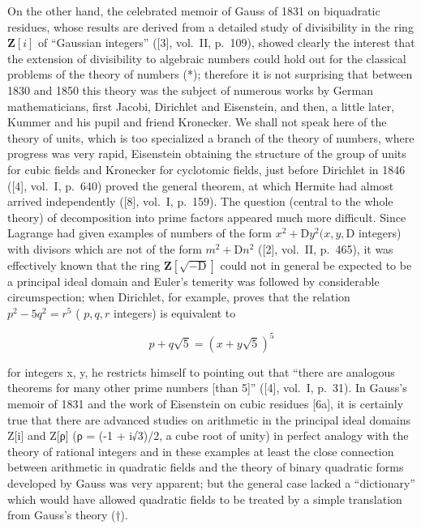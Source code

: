 On the other hand, the celebrated memoir of Gauss of 1831 on biquadratic residues, whose results are derived from a detailed study of divisibility in the ring \(\mathbf{Z}[i]\) of ``Gaussian integers'' ({[}3{]}, vol.~II, p.~109), showed clearly the interest that the extension of divisibility to algebraic numbers could hold out for the classical problems of the theory of numbers (*); therefore it is not surprising that between 1830 and 1850 this theory was the subject of numerous works by German mathematicians, first Jacobi, Dirichlet and Eisenstein, and then, a little later, Kummer and his pupil and friend Kronecker. We shall not speak here of the theory of units, which is too specialized a branch of the theory of numbers, where progress was very rapid, Eisenstein obtaining the structure of the group of units for cubic fields and Kronecker for cyclotomic fields, just before Dirichlet in 1846 ({[}4{]}, vol.~I, p.~640) proved the general theorem, at which Hermite had almost arrived independently ({[}8{]}, vol.~I, p.~159). The question (central to the whole theory) of decomposition into prime factors appeared much more difficult. Since Lagrange had given examples of numbers of the form \(x^{2} + \mathrm{D}y^{2}(x,y,\mathrm{D}\) integers) with divisors which are not of the form \(m^2 +\mathrm{D}n^2\) ({[}2{]}, vol.~II, p.~465), it was effectively known that the ring \(\mathbf{Z}[\sqrt{-\mathrm{D}} ]\) could not in general be expected to be a principal ideal domain and Euler's temerity was followed by considerable circumspection; when Dirichlet, for example, proves that the relation \(p^2 -5q^2 = r^5\) ( \(p,q,r\) integers) is equivalent to

\[
p + q \sqrt {5} = (x + y \sqrt {5}) ^ {5}
\]

for integers x, y, he restricts himself to pointing out that ``there are analogous theorems for many other prime numbers {[}than 5{]}'' ({[}4{]}, vol.~I, p.~31). In Gauss's memoir of 1831 and the work of Eisenstein on cubic residues {[}6a{]}, it is certainly true that there are advanced studies on arithmetic in the principal ideal domains Z{[}i{]} and Z{[}ρ{]} (ρ = (-1 + i√3)/2, a cube root of unity) in perfect analogy with the theory of rational integers and in these examples at least the close connection between arithmetic in quadratic fields and the theory of binary quadratic forms developed by Gauss was very apparent; but the general case lacked a ``dictionary'' which would have allowed quadratic fields to be treated by a simple translation from Gauss's theory (†).

